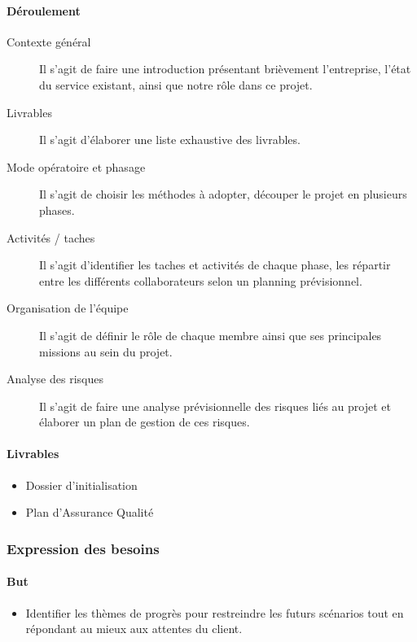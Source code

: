 \paragraph{Déroulement}
\begin{description}
    \item[Contexte général]{
        Il s’agit de faire une introduction présentant brièvement l’entreprise, l’état du service existant, ainsi que notre rôle dans ce projet.
    }
    \item[Livrables]{
        Il s’agit d’élaborer une liste exhaustive des livrables.
    }
    \item[Mode opératoire et phasage]{
        Il s’agit de choisir les méthodes à adopter, découper le projet en plusieurs phases.
    }
    \item[Activités / taches]{
        Il s’agit d’identifier les taches et activités de chaque phase, les répartir entre les différents collaborateurs selon un planning prévisionnel.
    }
    \item[Organisation de l’équipe]{
        Il s’agit de définir le rôle de chaque membre ainsi que ses principales missions au sein du projet.
    }
    \item[Analyse des risques]{
        Il s’agit de faire une analyse prévisionnelle des risques liés au projet et élaborer un plan de gestion de ces risques.
    }
\end{description}

\paragraph{Livrables}
\begin{itemize}
    \item Dossier d’initialisation
    \item Plan d'Assurance Qualité
\end{itemize}

\subsubsection{Expression des besoins}

\paragraph{But}
\begin{itemize}
    \item Identifier les thèmes de progrès pour restreindre les futurs scénarios tout en répondant au mieux aux attentes du client.
\end{itemize}


